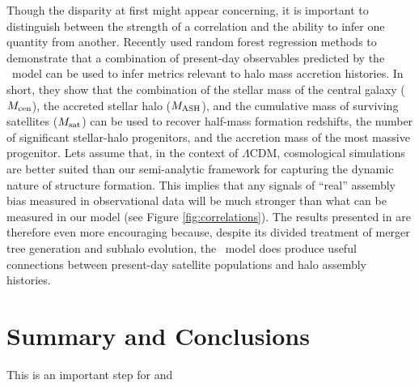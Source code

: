 \documentclass[twocolumn,apj,numberedappendix,twocolappendix,iop]{openjournal}
\begin{document}
Though the disparity at first might appear concerning, it is important to distinguish between the strength of a correlation and the ability to infer one quantity from another. Recently \cite{Monzon.etal.26} used random forest regression methods to demonstrate that a combination of present-day observables predicted by the \SatGen\ model can be used to infer metrics relevant to halo mass accretion histories. In short, they show that the combination of the stellar mass of the central galaxy ($M_{\rm cen}$), the accreted stellar halo ($M_{\rm ASH}$), and the cumulative mass of surviving satellites ($M_{\rm sat}$) can be used to recover half-mass formation redshifts, the number of significant stellar-halo progenitors, and the accretion mass of the most massive progenitor. Lets assume that, in the context of $\Lambda$CDM, cosmological simulations are better suited than our semi-analytic framework for capturing the dynamic nature of structure formation. This implies that any signals of ``real'' assembly bias measured in observational data will be much stronger than what can be measured in our model (see Figure \ref{fig:correlations}). The results presented in \cite{Monzon.etal.26} are therefore even more encouraging because, despite its divided treatment of merger tree generation and subhalo evolution, the \SatGen\ model does produce useful connections between present-day satellite populations and halo assembly histories.




\section{Summary and Conclusions}
\label{sec:conclusions}

This is an important step for  and 
\end{document}
